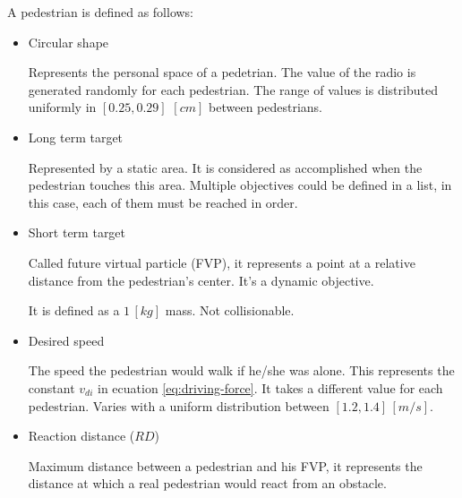 \documentclass[draftclsnofoot]{IEEEtran}
\begin{document}
A pedestrian is defined as follows: 
\begin{itemize}

    \item Circular shape
    
    Represents the personal space of a pedetrian. The value of the radio
    is generated randomly for each pedestrian. The range of values is
    distributed uniformly in $[0.25,0.29]$ $[cm]$ between pedestrians.
    
    \item Long term target
    
    Represented by a static area. It is considered as accomplished when 
    the pedestrian touches this area. Multiple objectives could be defined
    in a list, in this case, each of them must be reached in order.
    
    \item Short term target
    
    Called future virtual particle (FVP), it represents a point at a relative
    distance from the pedestrian's center. It's a dynamic objective.
    
    
    It is defined as a $1\,[kg]$ mass. Not collisionable.
    
    \item Desired speed
    
    The speed the pedestrian would walk if he/she was alone. This
    represents the constant $v_{di}$ in ecuation \ref{eq:driving-force}.
    It takes a different value for each pedestrian. Varies with a uniform
    distribution between $[1.2,1.4]\,[m/s]$.
    
    \item Reaction distance ($RD$)
    
    Maximum distance between a pedestrian and his FVP, it represents the
    distance at which a real pedestrian would react from an obstacle.

\end{itemize}

\vspace{1cm}
\end{document}
